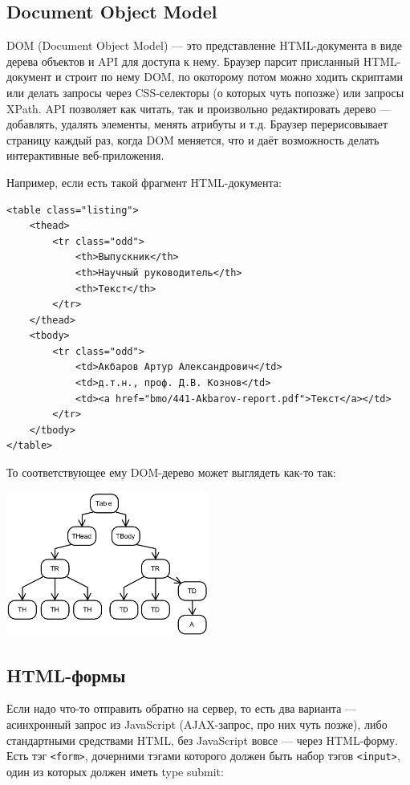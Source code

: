 \documentclass[a5paper]{article}
\begin{document}
\subsection{Document Object Model}

DOM (Document Object Model) --- это представление HTML-документа в виде дерева объектов и API для доступа к нему. Браузер парсит присланный HTML-документ и строит по нему DOM, по окоторому потом можно ходить скриптами или делать запросы через CSS-селекторы (о которых чуть попозже) или запросы XPath. API позволяет как читать, так и произвольно редактировать дерево --- добавлять, удалять элементы, менять атрибуты и т.д. Браузер перерисовывает страницу каждый раз, когда DOM меняется, что и даёт возможность делать интерактивные веб-приложения.

Например, если есть такой фрагмент HTML-документа:

\begin{verbatim}
<table class="listing">
    <thead>
        <tr class="odd">
            <th>Выпускник</th>
            <th>Научный руководитель</th>
            <th>Текст</th>
        </tr>
    </thead>
    <tbody>
        <tr class="odd">
            <td>Акбаров Артур Александрович</td>
            <td>д.т.н., проф. Д.В. Кознов</td>
            <td><a href="bmo/441-Akbarov-report.pdf">Текст</a></td>
        </tr>
    </tbody>
</table>
\end{verbatim}

То соответствующее ему DOM-дерево может выглядеть как-то так:

\begin{center}
    \includegraphics[width=0.5\textwidth]{domTree.png}
\end{center}

\subsection{HTML-формы}

Если надо что-то отправить обратно на сервер, то есть два варианта --- асинхронный запрос из JavaScript (AJAX-запрос, про них чуть позже), либо стандартными средствами HTML, без JavaScript вовсе --- через HTML-форму. Есть тэг \texttt{<form>}, дочерними тэгами которого должен быть набор тэгов \texttt{<input>}, один из которых должен иметь type submit:
\end{document}
